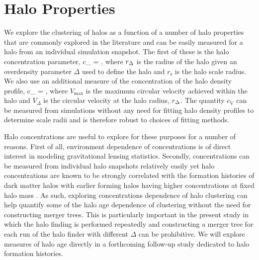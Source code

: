 \documentclass[usenatbib,usegraphicx,letterpaper]{mn2e}
\begin{document}
\section{Halo Properties}
\label{section:haloprops}




We explore the clustering of halos as a function of a number of halo properties that are commonly explored in the 
literature and can be easily measured for a halo from an individual simulation snapshot. The first of these is the 
halo concentration parameter, 
\beq
c_{} = ,
\eeq
where $r_{\Delta}$ is the radius of the halo given an overdensity parameter $\Delta$ used to define the halo and 
$r_{\mathrm{s}}$ is the halo scale radius. We also use an additional measure of the concentration of the halo 
density profile, 
\beq
c_{} = , 
\eeq
where $V_{\mathrm{max}}$ is the maximum circular velocity achieved within the halo and $V_{\Delta}$ is the circular 
velocity at the halo radius, $r_{\Delta}$. The quantity $c_{\mathrm{V}}$ can be measured from simulations without 
any need for fitting halo density profiles to determine scale radii and is therefore robust to choices of fitting methods. 


Halo concentrations are useful to explore for these purposes for a number of reasons. First of all, environment dependence 
of concentrations is of direct interest in modeling gravitational lensing statistics. Secondly, concentrations can be measured 
from individual halo snapshots relatively easily yet halo concentrations are known to be strongly correlated with the formation 
histories of dark matter halos with earlier forming halos having higher concentrations at fixed halo mass 
. As such, exploring concentrations dependence of halo clustering can 
help quantify some of the halo age dependence of clustering without the need for constructing merger trees. This 
is particularly important in the present study in which the halo finding is performed repeatedly and constructing a 
merger tree for each run of the halo finder with different $\Delta$ can be prohibitive. We will explore measures of 
halo age directly in a forthcoming follow-up study dedicated to halo formation histories.
\end{document}
